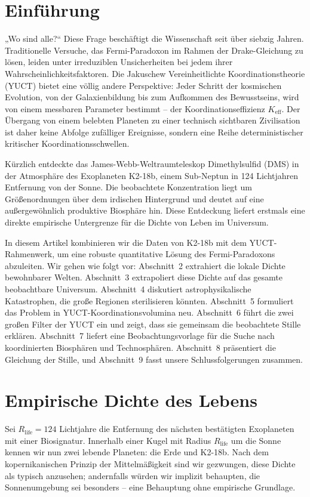 \documentclass[11pt,a4paper]{article}
\newcommand{\Keff}{K_{\mathrm{eff}}}
\begin{document}
	\tableofcontents
	\newpage
	
	\section{Einführung}
	\label{sec:intro}
	
	„Wo sind alle?“ Diese Frage beschäftigt die Wissenschaft seit über siebzig Jahren. Traditionelle Versuche, das Fermi-Paradoxon im Rahmen der Drake-Gleichung zu lösen, leiden unter irreduziblen Unsicherheiten bei jedem ihrer Wahrscheinlichkeitsfaktoren. Die Jakuschew Vereinheitlichte Koordinationstheorie (YUCT) bietet eine völlig andere Perspektive: Jeder Schritt der kosmischen Evolution, von der Galaxienbildung bis zum Aufkommen des Bewusstseins, wird von einem messbaren Parameter bestimmt – der Koordinationseffizienz \(\Keff\). Der Übergang von einem belebten Planeten zu einer technisch sichtbaren Zivilisation ist daher keine Abfolge zufälliger Ereignisse, sondern eine Reihe deterministischer kritischer Koordinationsschwellen.
	
	Kürzlich entdeckte das James-Webb-Weltraumteleskop Dimethylsulfid (DMS) in der Atmosphäre des Exoplaneten K2-18b, einem Sub-Neptun in 124 Lichtjahren Entfernung von der Sonne. Die beobachtete Konzentration liegt um Größenordnungen über dem irdischen Hintergrund und deutet auf eine außergewöhnlich produktive Biosphäre hin. Diese Entdeckung liefert erstmals eine direkte empirische Untergrenze für die Dichte von Leben im Universum.
	
	In diesem Artikel kombinieren wir die Daten von K2-18b mit dem YUCT-Rahmenwerk, um eine robuste quantitative Lösung des Fermi-Paradoxons abzuleiten. Wir gehen wie folgt vor: Abschnitt~2 extrahiert die lokale Dichte bewohnbarer Welten. Abschnitt~3 extrapoliert diese Dichte auf das gesamte beobachtbare Universum. Abschnitt~4 diskutiert astrophysikalische Katastrophen, die große Regionen sterilisieren könnten. Abschnitt~5 formuliert das Problem in YUCT-Koordinationsvolumina neu. Abschnitt~6 führt die zwei großen Filter der YUCT ein und zeigt, dass sie gemeinsam die beobachtete Stille erklären. Abschnitt~7 liefert eine Beobachtungsvorlage für die Suche nach koordinierten Biosphären und Technosphären. Abschnitt~8 präsentiert die Gleichung der Stille, und Abschnitt~9 fasst unsere Schlussfolgerungen zusammen.
	
	\section{Empirische Dichte des Lebens}
	\label{sec:empirical}
	Sei \(R_{\mathrm{life}} = 124\) Lichtjahre die Entfernung des nächsten bestätigten Exoplaneten mit einer Biosignatur. Innerhalb einer Kugel mit Radius \(R_{\mathrm{life}}\) um die Sonne kennen wir nun zwei lebende Planeten: die Erde und K2-18b. Nach dem kopernikanischen Prinzip der Mittelmäßigkeit sind wir gezwungen, diese Dichte als typisch anzusehen; andernfalls würden wir implizit behaupten, die Sonnenumgebung sei besonders – eine Behauptung ohne empirische Grundlage.
	
\end{document}
